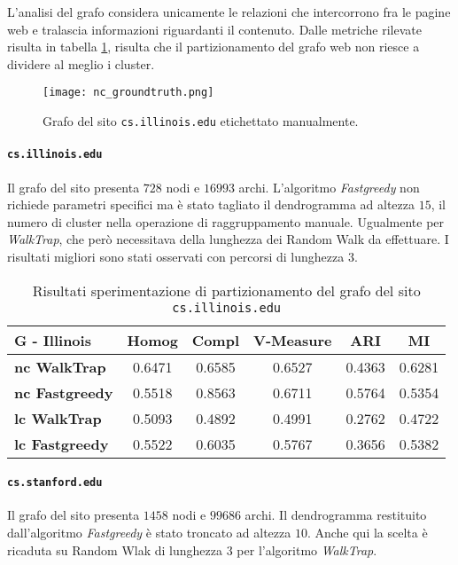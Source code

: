 L'analisi del grafo considera unicamente le relazioni che intercorrono fra le pagine web e tralascia informazioni riguardanti il contenuto. Dalle metriche rilevate risulta in tabella \ref{metricheGraphIll}, risulta che il partizionamento del grafo web non riesce a dividere al meglio i cluster.
 
\begin{figure}[htb]
	\centering
	\texttt{[image: nc\_groundtruth.png]}
	\caption{Grafo del sito \texttt{cs.illinois.edu} etichettato manualmente.}
	\label{nc_groundtruth}
\end{figure}

\paragraph{\texttt{cs.illinois.edu}} Il grafo del sito presenta $728$ nodi e $16993$ archi. L'algoritmo \textit{Fastgreedy} non richiede parametri specifici ma è stato tagliato il dendrogramma ad altezza $15$, il numero di cluster nella operazione di raggruppamento manuale. Ugualmente per \textit{WalkTrap}, che però necessitava della lunghezza dei Random Walk da effettuare. I risultati migliori sono stati osservati con percorsi di lunghezza $3$.
\begin{table}[H]
	\begin{tabular}{| l | c | c | c | c | c |}
	\hline
	\textbf{G - Illinois}  & \textbf{Homog} & \textbf{Compl} & \textbf{V-Measure}  & \textbf{ARI}  & \textbf{MI} \\ [3ex] \hline
	\textbf{nc WalkTrap} & 0.6471 & 0.6585 & 0.6527 & 0.4363 & 0.6281\\ [3ex]
	 \hline
	\textbf{nc Fastgreedy} & 0.5518 & 0.8563 & 0.6711 & 0.5764 & 0.5354\\ [3ex]
	 \hline	
	\textbf{lc WalkTrap} & 0.5093 & 0.4892 & 0.4991 & 0.2762 & 0.4722\\ [3ex]
	 \hline	
	\textbf{lc Fastgreedy} & 0.5522 & 0.6035 & 0.5767 & 0.3656 & 0.5382\\ [3ex]
	\hline
	\end{tabular}
	\caption{Risultati sperimentazione di partizionamento del grafo del sito \texttt{cs.illinois.edu}}
	\label{metricheGraphIll}
\end{table}
 
\paragraph{\texttt{cs.stanford.edu}} Il grafo del sito presenta $1458$ nodi e $99686$ archi. Il dendrogramma restituito dall'algoritmo \textit{Fastgreedy} è stato troncato ad altezza $10$. Anche qui la scelta è ricaduta su Random Wlak di lunghezza $3$ per l'algoritmo \textit{WalkTrap}.

